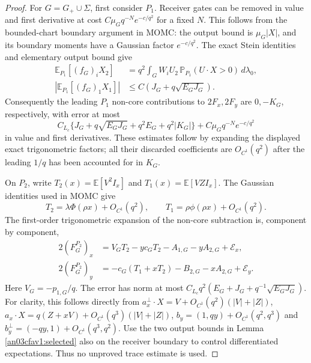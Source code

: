 \documentclass[11pt]{article}
\theoremstyle{remark}\newtheorem{remark}[theorem]{Remark}
\newcommand{\E}{\mathbb E}
\newcommand{\dd}{\,d}
\newcommand{\Gp}{G_+}
\begin{document}
\begin{proof}
For $G=\Gp\cup\Sigma$, first consider $P_1$.
Receiver gates can be removed in value and first derivative
at cost $C\mu_G q^{-N}e^{-c/q^2}$ for a fixed $N$.
This follows from the bounded-chart boundary argument in
MOMC: the output bound is $\mu_G|X|$, and its boundary
moments have a Gaussian factor $e^{-c/q^2}$.
The exact Stein identities and elementary output bound give
\begin{align}
 \E_{P_1}[(f_G)_iX_2]
 &=q^2\int_GW_iU_2\,\mathbb P_{P_1}(U\cdot X>0)\dd\lambda_0,
 \nonumber\\
 |\E_{P_1}[(f_G)_1X_1]|
 &\le C(J_G+q\sqrt{E_GJ_G}).
 \label{an03cfav1:P1stein}
\end{align}
Consequently the leading $P_1$ non-core contributions to
$2F_x,2F_y$ are $0,-K_G$, respectively, with error at most
\begin{equation}
 C_{L_c}\{J_G+q\sqrt{E_GJ_G}+q^2E_G+q^2|K_G|\}
                  +C\mu_G q^{-N}e^{-c/q^2}
 \label{an03cfav1:P1error}
\end{equation}
in value and first derivatives. These estimates follow by
expanding the displayed exact trigonometric factors; all
their discarded coefficients are $O_{C^1}(q^2)$ after the
leading $1/q$ has been accounted for in $K_G$.

On $P_2$, write
$T_2(x)=\E[V^2I_x]$ and $T_1(x)=\E[VZI_x]$.
The Gaussian identities used in MOMC give
\begin{equation}
 T_2=\lambda\Phi(\rho x)+O_{C^1}(q^2),\qquad
 T_1=\rho\phi(\rho x)+O_{C^1}(q^2).
 \label{an03cfav1:gaussian}
\end{equation}
The first-order trigonometric expansion of the non-core
subtraction is, component by component,
\begin{align}
 2(F_G^{P_2})_x
 &=V_GT_2-yc_GT_2-A_{1,G}-yA_{2,G}
                              +\mathcal E_x,\nonumber\\
 2(F_G^{P_2})_y
 &=-c_G(T_1+xT_2)-B_{2,G}-xA_{2,G}
                              +\mathcal E_y.
 \label{an03cfav1:P2assembly}
\end{align}
Here $V_G=-p_{1,G}/q$. The error has norm at most
$C_{L_c}q^2(E_G+J_G+q^{-1}\sqrt{E_GJ_G})$.
For clarity, this follows directly from
$a_x^\perp\cdot X=V+O_{C^1}(q^2)(|V|+|Z|)$,
$a_x\cdot X=q(Z+xV)+O_{C^1}(q^3)(|V|+|Z|)$,
$b_y=(1,qy)+O_{C^1}(q^2,q^3)$ and
$b_y^\perp=(-qy,1)+O_{C^1}(q^3,q^2)$.
Use the two output bounds in Lemma \ref{an03cfav1:selected}
also on the receiver boundary to control differentiated
expectations. Thus no unproved trace estimate is used.


\end{proof}
\end{document}
